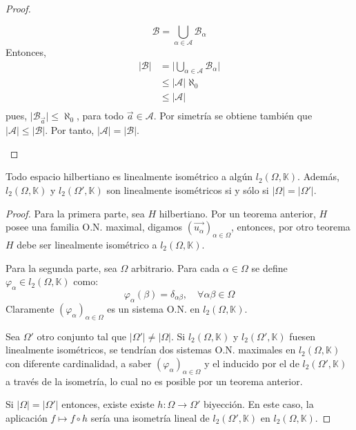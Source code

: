 \documentclass[12pt]{report}
\theoremstyle{largebreak}
\newcommand\cf[3]{\ensuremath{#1:#2\rightarrow#3}}
\newcommand\abs[1]{\ensuremath{\big|#1\big|}}
\begin{document}
\begin{proof}
\begin{enumerate}
            \begin{equation*}
                \mathcal{B}=\bigcup_{\alpha\in\mathcal{A}}\mathcal{B}_\alpha
            \end{equation*}
            Entonces,
            \begin{equation*}
                \begin{split}
                    \abs{\mathcal{B}}&=\abs{\bigcup_{\alpha\in\mathcal{A}}\mathcal{B}_\alpha}\\
                    &\leq\abs{\mathcal{A}}\aleph_0\\
                    &\leq\abs{\mathcal{A}}\\
                \end{split}
            \end{equation*}
            pues, $\abs{\mathcal{B}_{\vec{a}}}\leq\aleph_0$, para todo $\vec{a}\in\mathcal{A}$. Por simetría se obtiene también que $\abs{\mathcal{A}}\leq\abs{\mathcal{B}}$. Por tanto, $\abs{\mathcal{A}}=\abs{\mathcal{B}}$.
        \end{enumerate}
    \end{proof}

    \begin{theor}
        Todo espacio hilbertiano es linealmente isométrico a algún $l_2(\Omega,\mathbb{K})$. Además, $l_2(\Omega,\mathbb{K})$ y $l_2(\Omega',\mathbb{K})$ son linealmente isométricos si y sólo si $\abs{\Omega}=\abs{\Omega'}$.
    \end{theor}

    \begin{proof}
        Para la primera parte, sea $H$ hilbertiano. Por un teorema anterior, $H$ posee una familia O.N. maximal, digamos $\left(\vec{u_\alpha} \right)_{\alpha\in\Omega}$, entonces, por otro teorema $H$ debe ser linealmente isométrico a $l_2(\Omega,\mathbb{K})$.

        Para la segunda parte, sea $\Omega$ arbitrario. Para cada $\alpha\in\Omega$ se define $\varphi_\alpha\in l_2(\Omega,\mathbb{K})$ como:
        \begin{equation*}
            \varphi_{\alpha}(\beta)=\delta_{\alpha\beta},\quad\forall\alpha\beta\in\Omega
        \end{equation*}
        Claramente $\left(\varphi_\alpha \right)_{\alpha\in\Omega}$ es un sistema O.N. en $l_2(\Omega,\mathbb{K})$.

        Sea $\Omega'$ otro conjunto tal que $\abs{\Omega'}\neq\abs{\Omega}$. Si $l_2(\Omega,\mathbb{K})$ y $l_2(\Omega',\mathbb{K})$ fuesen linealmente isométricos, se tendrían dos sistemas O.N. maximales en $l_2(\Omega,\mathbb{K})$ con diferente cardinalidad, a saber $\left(\varphi_\alpha \right)_{\alpha\in\Omega}$ y el inducido por el de $l_2(\Omega',\mathbb{K})$ a través de la isometría, lo cual no es posible por un teorema anterior.

        Si $\abs{\Omega}=\abs{\Omega'}$ entonces, existe existe $\cf{h}{\Omega}{\Omega'}$ biyección. En este caso, la aplicación $f\mapsto f\circ h$ sería una isometría lineal de $l_2(\Omega',\mathbb{K})$ en $l_2(\Omega,\mathbb{K})$.
    \end{proof}
\end{document}
